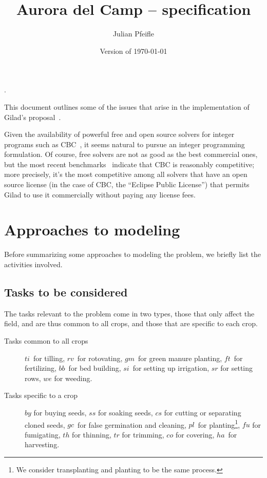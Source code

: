 \documentclass[11pt]{amsart}
\numberwithin{equation}{section}
\begin{document}
\renewcommand*\descriptionlabel[1]{%
\hspace\labelsep\normalfont\itshape #1:}.

\title{Aurora del Camp -- specification}
\author{Julian Pfeifle}
\date{Version of \today}
\maketitle

This document outlines some of the issues that arise in the
implementation of Gilad's proposal~\cite{buzi11}.

\medskip
Given the availability of powerful free and open source solvers for
integer programs such as CBC~\cite{cbc}, it seems natural to pursue an
integer programming formulation. Of course, free solvers are not as
good as the best commercial ones, but the most recent
benchmarks~\cite{mittelmann11} indicate that CBC is reasonably
competitive; more precisely, it's the most competitive among all
solvers that have an open source license (in the case of CBC, the
``Eclipse Public License'') that permits Gilad to use it commercially
without paying any license fees.

\section{Approaches to modeling}

Before summarizing some  approaches to modeling the problem,
we briefly list the activities involved.

\subsection{Tasks to be considered}

The tasks relevant to the problem come in two types, those that only
affect the field, and are thus common to all crops, and those that are
specific to each crop.

\begin{description}
\item[Tasks common to all crops]  $ti$~for tilling, $rv$~for
  rotovating, $gm$~for green manure planting, $ft$~for fertilizing,
  $bb$~for bed building, $si$~for setting up irrigation, $sr$ for
  setting rows, $we$ for weeding.

\smallskip
\item[Tasks specific to a crop] $by$ for buying seeds, $ss$ for
  soaking seeds, $cs$ for cutting or separating cloned seeds, $gc$~for
  false germination and cleaning, $pl$~for planting\footnote{We
    consider transplanting and planting to be the same process.},
  $f\!u$ for fumigating, $th$ for thinning, $tr$ for trimming, $co$
  for covering, $ha$~for harvesting.
\end{description}
\end{document}
